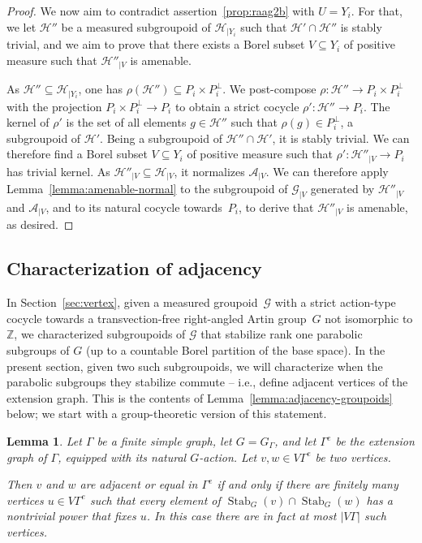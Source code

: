 \documentclass[11pt]{article}
\newcommand{\ie}{i.e.,\xspace}
\numberwithin{equation}{section}
\let\mathcal\mathscr
\theoremstyle{plain}
\newtheorem{lemma}[theo]{Lemma}
\theoremstyle{definition}
\newcommand{\cala}{\mathcal{A}}
\newcommand{\calg}{\mathcal{G}}
\newcommand{\calh}{\mathcal{H}}
\newcommand{\Stab}{\operatorname{Stab}}
\begin{document}
\begin{proof}
We now aim to contradict assertion~\eqref{prop:raag2b} with $U=Y_i$. For that, we let $\calh''$ be a measured subgroupoid of $\calh_{|Y_i}$ such that $\calh'\cap\calh''$ is stably trivial, and we aim to prove that there exists a Borel subset $V\subseteq Y_i$ of positive measure such that $\calh''_{|V}$ is amenable.

As $\calh''\subseteq\calh_{|Y_i}$, one has $\rho(\calh'')\subseteq P_i\times P_i^{\perp}$. We post-compose $\rho:\calh''\to P_i\times P_i^{\perp}$ with the projection $P_i\times P_i^{\perp}\to P_i$ to obtain a strict cocycle $\rho':\calh''\to P_i$. The kernel of $\rho'$ is the set of all elements $g\in\calh''$ such that $\rho(g)\in P_i^{\perp}$, a subgroupoid of $\calh'$. Being a subgroupoid of $\calh''\cap\calh'$, it is stably trivial. We can therefore find a Borel subset $V\subseteq Y_i$ of positive measure such that $\rho':\calh''_{|V}\to P_i$ has trivial kernel. As $\calh''_{|V}\subseteq\calh_{|V}$, it normalizes $\cala_{|V}$. We can therefore apply Lemma~\ref{lemma:amenable-normal} to the subgroupoid of $\calg_{|V}$ generated by $\calh''_{|V}$ and $\cala_{|V}$, and to its natural cocycle towards~$P_i$, to derive that $\calh''_{|V}$ is amenable, as desired.
\end{proof}

\subsection{Characterization of adjacency}

In Section~\ref{sec:vertex}, given a measured groupoid~$\calg$ with a strict action-type cocycle towards a transvection-free right-angled Artin group~$G$ not isomorphic to $\mathbb{Z}$, we characterized subgroupoids of $\calg$ that stabilize rank one parabolic subgroups of $G$ (up to a countable Borel partition of the base space). In the present section, given two such subgroupoids, we will characterize when the parabolic subgroups they stabilize commute -- \ie define adjacent vertices of the extension graph. This is the contents of Lemma~\ref{lemma:adjacency-groupoids} below; we start with a group-theoretic version of this statement.

\begin{lemma}
\label{lem:fix point}
Let $\Gamma$ be a finite simple graph, let $G=G_\Gamma$, and let $\Gamma^e$ be the extension graph of $\Gamma$, equipped with its natural $G$-action. Let $v,w\in V\Gamma^e$ be two vertices.

Then $v$ and $w$ are adjacent or equal in $\Gamma^e$ if and only if there are finitely many vertices $u\in V\Gamma^e$ such that every element of $\Stab_G(v)\cap\Stab_G(w)$ has a nontrivial power that fixes $u$. In this case there are in fact at most $|V\Gamma|$ such vertices.
\end{lemma}
\end{document}
